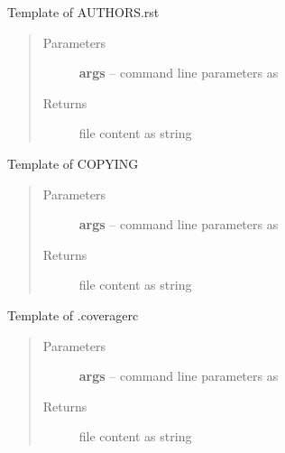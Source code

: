 \documentclass[letterpaper,10pt,english]{sphinxmanual}
\begin{document}
\begin{fulllineitems}
\label{_rst/pyscaffold:pyscaffold.templates.authors}
Template of AUTHORS.rst
\begin{quote}\begin{description}
\item[{Parameters}] \leavevmode
\textbf{args} -- command line parameters as \href{http://docs.python.org/2.7/library/argparse.html\#argparse.Namespace}{}

\item[{Returns}] \leavevmode
file content as string

\end{description}\end{quote}

\end{fulllineitems}


\begin{fulllineitems}
\label{_rst/pyscaffold:pyscaffold.templates.copying}
Template of COPYING
\begin{quote}\begin{description}
\item[{Parameters}] \leavevmode
\textbf{args} -- command line parameters as \href{http://docs.python.org/2.7/library/argparse.html\#argparse.Namespace}{}

\item[{Returns}] \leavevmode
file content as string

\end{description}\end{quote}

\end{fulllineitems}


\begin{fulllineitems}
\label{_rst/pyscaffold:pyscaffold.templates.coveragerc}
Template of .coveragerc
\begin{quote}\begin{description}
\item[{Parameters}] \leavevmode
\textbf{args} -- command line parameters as \href{http://docs.python.org/2.7/library/argparse.html\#argparse.Namespace}{}

\item[{Returns}] \leavevmode
file content as string

\end{description}\end{quote}

\end{fulllineitems}
\end{document}
